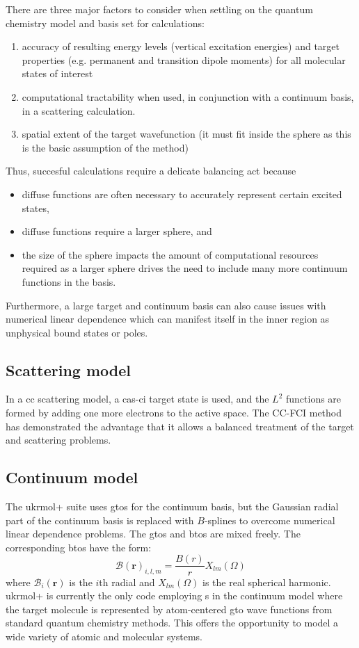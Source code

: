\documentclass[12pt]{article}
\newcommand{\vect}[1]{\boldsymbol{#1}}
\begin{document}
There are three major factors to consider when settling on the 
quantum chemistry model and basis set for \rmat{} calculations:
\begin{enumerate}
		\item accuracy of resulting energy
				levels (vertical excitation energies) and target properties (e.g.
				permanent and transition dipole moments) for all molecular
				states of interest
		\item computational tractability when used, in conjunction with a
				continuum basis, in a scattering calculation. 
		\item spatial extent of the target wavefunction (it must fit inside the \rmat{} sphere as this is
				the basic assumption of the method) 
\end{enumerate}	
Thus, succesful \rmat{} calculations require a delicate balancing act because
\begin{itemize}
		\item diffuse functions are
				often necessary to accurately represent certain excited states,
		\item diffuse functions require a larger \rmat{} sphere, and
		\item the size of the \rmat{} sphere impacts the amount of
				computational resources required as a larger sphere 
				drives the need to include many more continuum functions in the basis.
\end{itemize}
Furthermore, a large target and continuum basis can also
cause issues with numerical linear dependence which can
manifest itself in the inner region as unphysical bound states
or \rmat{} poles.

\subsection{Scattering model}
In a \ac{cc} scattering model, a \ac{cas}-\ac{ci} target state 
is used, and the $L^2$ functions are
formed by adding one more electrons to the active space. 
The CC-FCI method has demonstrated the advantage that it allows a balanced treatment
of the target and scattering problems.

\subsection{Continuum model}
The \ac{ukrmol+} suite uses \acp{gto} for the continuum basis, but
the Gaussian radial part of the continuum basis
is replaced with $B$-splines to overcome numerical linear dependence problems. 
The \acp{gto} and \acp{bto} are mixed freely.
The corresponding
\acp{bto} have the form:
\begin{equation}
		\mathcal{B}(\vect{r})_{i,l,m} = \frac{B(r)}{r} X_{lm}(\Omega)
\end{equation}
where $\mathcal{B}_i(\vect{r})$ is the $i$th radial \bspline{} 
and $X_{lm}(\Omega)$ is the real spherical harmonic. 
\ac{ukrmol+} is currently the only \rmat code employing \bspline s 
in the continuum model
where the target molecule is represented by atom-centered \ac{gto} 
wave functions from standard
quantum chemistry methods. This offers the opportunity to model
a wide variety of atomic and molecular systems.
\end{document}

